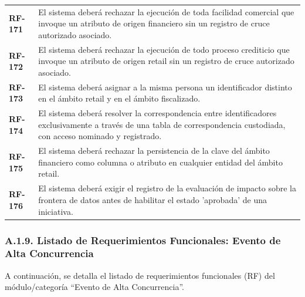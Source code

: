 \documentclass[11pt]{article}
\begin{document}
\begin{longtable}[]{@{}
  >{\raggedright\arraybackslash}p{}
  >{\raggedright\arraybackslash}p{}@{}}
\textbf{RF-171} & El sistema deberá rechazar la ejecución de toda facilidad comercial que invoque un atributo de origen financiero sin un registro de cruce autorizado asociado. \\
\addlinespace[2pt]
\textbf{RF-172} & El sistema deberá rechazar la ejecución de todo proceso crediticio que invoque un atributo de origen retail sin un registro de cruce autorizado asociado. \\
\addlinespace[2pt]
\textbf{RF-173} & El sistema deberá asignar a la misma persona un identificador distinto en el ámbito retail y en el ámbito fiscalizado. \\
\addlinespace[2pt]
\textbf{RF-174} & El sistema deberá resolver la correspondencia entre identificadores exclusivamente a través de una tabla de correspondencia custodiada, con acceso nominado y registrado. \\
\addlinespace[2pt]
\textbf{RF-175} & El sistema deberá rechazar la persistencia de la clave del ámbito financiero como columna o atributo en cualquier entidad del ámbito retail. \\
\addlinespace[2pt]
\textbf{RF-176} & El sistema deberá exigir el registro de la evaluación de impacto sobre la frontera de datos antes de habilitar el estado 'aprobada' de una iniciativa. \\
\end{longtable}

\subsubsection{A.1.9. Listado de Requerimientos Funcionales: Evento de Alta Concurrencia}\label{a-1-9-listado-de-requerimientos-funcionales-evento-de-alta-concurrencia}

A continuación, se detalla el listado de requerimientos funcionales (RF) del módulo/categoría ``Evento de Alta Concurrencia''.
\end{document}
